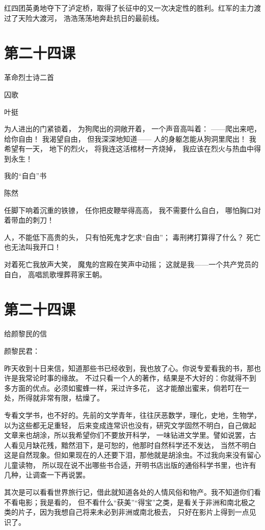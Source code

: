 \documentclass[12pt,UTF8]{ctexbook}
\begin{document}
红四团英勇地夺下了泸定桥，取得了长征中的又一次决定性的胜利。红军的主力渡过了天险大渡河，
浩浩荡荡地奔赴抗日的最前线。

\section{第二十四课}

革命烈士诗二首

囚歌　　

叶挺

为人进出的门紧锁着，
为狗爬出的洞敞开着，
一个声音高叫着：
——爬出来吧，给你自由！
我渴望自由，
但我深深地知道——
人的身躯怎能从狗洞里爬出！
我希望有一天，
地下的烈火，
将我连这活棺材一齐烧掉，
我应该在烈火与热血中得到永生！

我的“自白”书　

陈然

任脚下响着沉重的铁镣，
任你把皮鞭举得高高，
我不需要什么自白，
哪怕胸口对着带血的刺刀！

人，不能低下高贵的头，
只有怕死鬼才乞求“自由”；
毒刑拷打算得了什么？
死亡也无法叫我开口！

对着死亡我放声大笑，
魔鬼的宫殿在笑声中动摇；
这就是我——一个共产党员的自白，
高唱凯歌埋葬蒋家王朝。

\section{第二十四课}

给颜黎民的信

颜黎民君：

昨天收到十日来信，知道那些书已经收到，我也放了心。你说专爱看我的书，那也许是我常论时事的缘故。
不过只看一个人的著作，结果是不大好的：你就得不到多方面的优点。必须如蜜蜂一样，采过许多花，
这才能酿出蜜来，倘若叮在一处，所得就非常有限，枯燥了。

专看文学书，也不好的。先前的文学青年，往往厌恶数学，理化，史地，生物学，以为这些都无足重轻，
后来变成连常识也没有，研究文学固然不明白，自己做起文章来也胡涂，所以我希望你们不要放开科学，
一味钻进文学里。譬如说罢，古人看见月缺花残，黯然泪下，是可恕的，他那时自然科学还不发达，
当然不明白这是自然现象。但如果现在的人还要下泪，那他就是胡涂虫。不过我向来没有留心儿童读物，
所以现在说不出哪些书合适，开明书店出版的通俗科学书里，也许有几种，让调查一下再说罢。

其次是可以看看世界旅行记，借此就知道各处的人情风俗和物产。我不知道你们看不看电影；我是看的，
但不看什么“获美”“得宝”之类，是看关于非洲和南北极之类的片子，因为我想自己将来未必到非洲或南北极去，
只好在影片上得到一点见识了。
\end{document}
